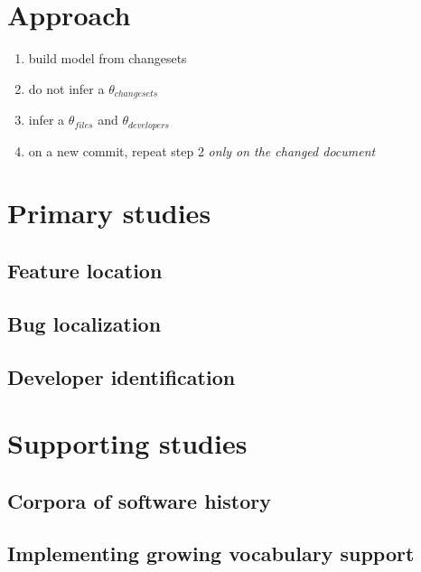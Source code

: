 \section{Approach}
\begin{enumerate}
    \item build model from changesets
    \item do not infer a $\theta_{changesets}$
    \item infer a $\theta_{files}$ and $\theta_{developers}$
    \item on a new commit, repeat step 2 \emph{only on the changed document}
\end{enumerate}

\section{Primary studies}
    \subsection{Feature location}
    \subsection{Bug localization}
    \subsection{Developer identification}
\section{Supporting studies}
    \subsection{Corpora of software history}
    \subsection{Implementing growing vocabulary support}
